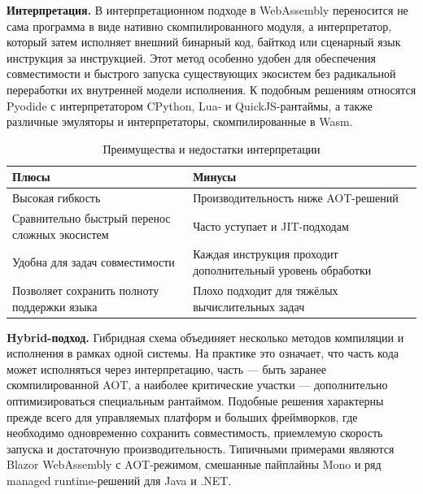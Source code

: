     \quad \textbf{Интерпретация.} В интерпретационном подходе в WebAssembly переносится не сама программа в виде нативно скомпилированного модуля, а интерпретатор, который затем исполняет внешний бинарный код, байткод или сценарный язык инструкция за инструкцией. Этот метод особенно удобен для обеспечения совместимости и быстрого запуска существующих экосистем без радикальной переработки их внутренней модели исполнения. К подобным решениям относятся Pyodide с интерпретатором CPython, Lua- и QuickJS-рантаймы, а также различные эмуляторы и интерпретаторы, скомпилированные в Wasm.

\begin{table}[htbp]
\centering
\scriptsize
\renewcommand{\arraystretch}{1.15}
\begin{tabular}{|p{5.8cm}|p{5.8cm}|}
\hline
\textbf{Плюсы} & \textbf{Минусы} \\
\hline
Высокая гибкость & Производительность ниже AOT-решений \\
\hline
Сравнительно быстрый перенос сложных экосистем & Часто уступает и JIT-подходам \\
\hline
Удобна для задач совместимости & Каждая инструкция проходит дополнительный уровень обработки \\
\hline
Позволяет сохранить полноту поддержки языка & Плохо подходит для тяжёлых вычислительных задач \\
\hline
\end{tabular}
\caption{Преимущества и недостатки интерпретации}
\label{tab:interpretation_pros_cons}
\end{table}

    \quad \textbf{Hybrid-подход.} Гибридная схема объединяет несколько методов компиляции и исполнения в рамках одной системы. На практике это означает, что часть кода может исполняться через интерпретацию, часть --- быть заранее скомпилированной AOT, а наиболее критические участки --- дополнительно оптимизироваться специальным рантаймом. Подобные решения характерны прежде всего для управляемых платформ и больших фреймворков, где необходимо одновременно сохранить совместимость, приемлемую скорость запуска и достаточную производительность. Типичными примерами являются Blazor WebAssembly с AOT-режимом, смешанные пайплайны Mono и ряд managed runtime-решений для Java и .NET.

